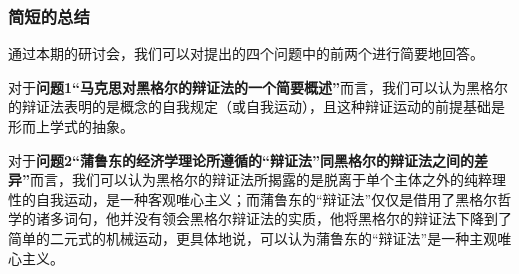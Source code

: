 \documentclass[a4paper,twoside,12pt,AutoFakeBold]{ctexart}
\begin{document}
\subsubsection{简短的总结}

通过本期的研讨会，我们可以对提出的四个问题中的前两个进行简要地回答。

对于\textbf{问题1“马克思对黑格尔的辩证法的一个简要概述”}而言，我们可以认为黑格尔的辩证法表明的是概念的自我规定（或自我运动），且这种辩证运动的前提基础是形而上学式的抽象。

对于\textbf{问题2“蒲鲁东的经济学理论所遵循的“辩证法”同黑格尔的辩证法之间的差异”}而言，我们可以认为黑格尔的辩证法所揭露的是脱离于单个主体之外的纯粹理性的自我运动，是一种客观唯心主义；而蒲鲁东的“辩证法”仅仅是借用了黑格尔哲学的诸多词句，他并没有领会黑格尔辩证法的实质，他将黑格尔的辩证法下降到了简单的二元式的机械运动，更具体地说，可以认为蒲鲁东的“辩证法”是一种主观唯心主义。
\end{document}
